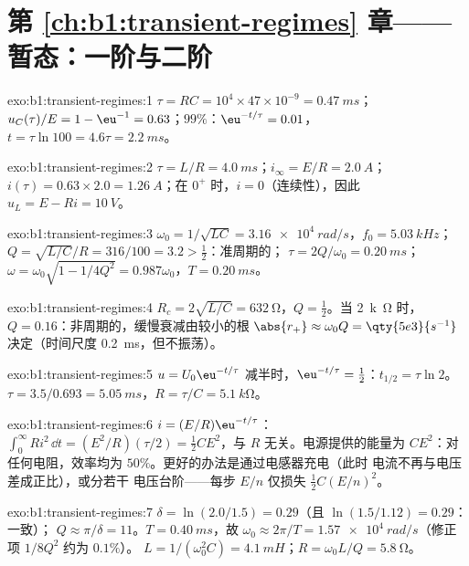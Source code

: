 \section*{第 \ref{ch:b1:transient-regimes} 章——暂态：一阶与二阶}

\begin{solution}{exo:b1:transient-regimes:1}
$\tau = RC = 10^4 \times 47\times10^{-9} = \qty{0.47}{ms}$；$u_C(\tau)/E
= 1 - \eu^{-1} = 0.63$；$99\%$：$\eu^{-t/\tau} = 0.01$，$t = \tau\ln 100
= 4.6\tau = \qty{2.2}{ms}$。
\end{solution}

\begin{solution}{exo:b1:transient-regimes:2}
$\tau = L/R = \qty{4.0}{ms}$；$i_\infty = E/R = \qty{2.0}{A}$；$i(\tau) =
0.63 \times 2.0 = \qty{1.26}{A}$；在 $0^+$ 时，$i = 0$（连续性），因此
$u_L = E - Ri = \qty{10}{V}$。
\end{solution}

\begin{solution}{exo:b1:transient-regimes:3}
$\omega_0 = 1/\sqrt{LC} = \qty{3.16e4}{rad/s}$，$f_0 = \qty{5.03}{kHz}$；
$Q = \sqrt{L/C}/R = 316/100 = 3.2 > \tfrac12$：准周期的；
$\tau = 2Q/\omega_0 = \qty{0.20}{ms}$；$\omega = \omega_0\sqrt{1 - 1/4Q^2}
= 0.987\omega_0$，$T = \qty{0.20}{ms}$。
\end{solution}

\begin{solution}{exo:b1:transient-regimes:4}
$R_c = 2\sqrt{L/C} = \qty{632}{\ohm}$，$Q = \tfrac12$。当 \qty{2}{k\ohm} 时，
$Q = 0.16$：非周期的，缓慢衰减由较小的根
$\abs{r_+} \approx \omega_0 Q = \qty{5e3}{s^{-1}}$ 决定（时间尺度
\qty{0.2}{ms}，但不振荡）。
\end{solution}

\begin{solution}{exo:b1:transient-regimes:5}
$u = U_0\eu^{-t/\tau}$ 减半时，$\eu^{-t/\tau} = \tfrac12$：$t_{1/2}
= \tau\ln 2$。$\tau = 3.5/0.693 = \qty{5.05}{ms}$，$R = \tau/C =
\qty{5.1}{k\ohm}$。
\end{solution}

\begin{solution}{exo:b1:transient-regimes:6}
$i = (E/R)\eu^{-t/\tau}$：$\int_0^\infty Ri^2\,\dd t = (E^2/R)(\tau/2) =
\tfrac12 CE^2$，与 $R$ 无关。电源提供的能量为 $CE^2$：对任何电阻，效率均为
$50\%$。更好的办法是通过电感器充电（此时
电流不再与电压差成正比），或分若干
电压台阶——每步 $E/n$ 仅损失 $\tfrac12 C(E/n)^2$。
\end{solution}

\begin{solution}{exo:b1:transient-regimes:7}
$\delta = \ln(2.0/1.5) = 0.29$（且 $\ln(1.5/1.12) = 0.29$：一致）；
$Q \approx \pi/\delta = 11$。$T = \qty{0.40}{ms}$，故 $\omega_0 \approx
2\pi/T = \qty{1.57e4}{rad/s}$（修正项 $1/8Q^2$ 约为 $0.1\%$）。
$L = 1/(\omega_0^2 C) = \qty{4.1}{mH}$；$R = \omega_0 L/Q = \qty{5.8}{\ohm}$。
\end{solution}

